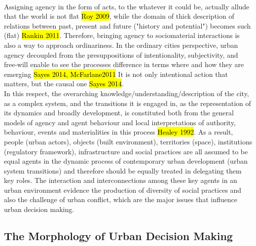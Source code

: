 \documentclass[11pt]{report}
\begin{document}
\\
Assigning agency in the form of acts, to the whatever it could be, actually allude that the world is not flat \hl{Roy 2009}, while the domain of thick description of relations between past, present and future ("history and potential") becomes such (flat) \hl{Rankin 2011}.
Therefore, bringing agency to sociomaterial interactions is also a way to approach ordinariness. In the ordinary cities perspective, urban agency decoupled from the presuppositions of intentionality, subjectivity, and free-will enable to see the processes difference in terms where and how they are emerging \hl{Sayes 2014, McFarlane2011}
It is not only intentional action that matters, but the causal one  
\hl{Sayes 2014}.
\\
In this respect, the overarching knowledge/understanding/description of the city, as a complex system, and the transitions it is engaged in, as the representation of its dynamics and broadly development, is constituted both from the general models of agency and agent behaviour and local interpretations of authority, behaviour, events and materialities in this process \hl{Healey 1992}.
As a result, people (urban actors), objects (built environment), territories (space), institutions (regulatory framework), infrastructure and social practices are all assumed to be equal agents in the dynamic process of contemporary urban development (urban system transitions) and therefore should be equally treated in delegating them key roles. The interaction and interconnections among these key agents in an urban environment evidence the production of diversity of social practices and also the challenge of urban conflict, which are the major issues that influence urban decision making. 

\subsection{The Morphology of Urban Decision Making}
\end{document}
